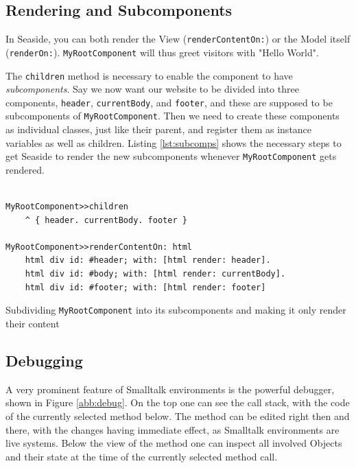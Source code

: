\documentclass[a4paper,12pt,pagesize,headsepline,oribibl,titlepage]{scrartcl}
\begin{document}
\subsection{Rendering and Subcomponents}

In Seaside, you can both render the View (\texttt{renderContentOn:}) or the Model itself (\texttt{renderOn:}). \texttt{MyRootComponent} will thus greet visitors with "Hello World".

The \texttt{children} method is necessary to enable the component to have \emph{subcomponents}. Say we now want our website to be divided into three components, \texttt{header}, \texttt{currentBody}, and \texttt{footer}, and these are supposed to be subcomponents of \texttt{MyRootComponent}. Then we need to create these components as individual classes, just like their parent, and register them as  instance variables as well as children. Listing \ref{lst:subcomps} shows the necessary steps to get Seaside to render the new subcomponents whenever \texttt{MyRootComponent} gets rendered.

\begin{listing}[]%
\begin{verbatim}

MyRootComponent>>children
    ^ { header. currentBody. footer }

MyRootComponent>>renderContentOn: html
    html div id: #header; with: [html render: header].
    html div id: #body; with: [html render: currentBody].
    html div id: #footer; with: [html render: footer]

\end{verbatim}
\caption{Subdividing \texttt{MyRootComponent} into its subcomponents and making it only render their content}
\label{lst:subcomps}
\end{listing}

\subsection{Debugging}

A very prominent feature of Smalltalk environments is the powerful debugger, shown in Figure \ref{abb:debug}. On the top one can see the call stack, with the code of the currently selected method below. The method can be edited right then and there, with the changes having immediate effect, as Smalltalk environments are live systems. Below the view of the method one can inspect all involved Objects and their state at the time of the currently selected method call. 
\end{document}
